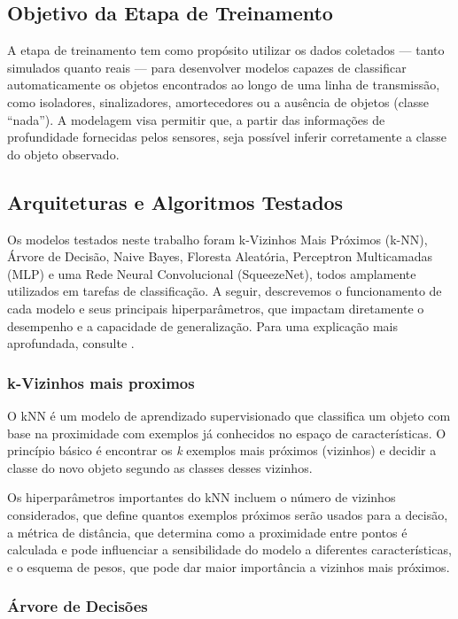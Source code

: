 \subsection{Objetivo da Etapa de Treinamento}

A etapa de treinamento tem como propósito utilizar os dados coletados — tanto simulados quanto reais — para desenvolver modelos capazes de classificar automaticamente os objetos encontrados ao longo de uma linha de transmissão, como isoladores, sinalizadores, amortecedores ou a ausência de objetos (classe “nada”). A modelagem visa permitir que, a partir das informações de profundidade fornecidas pelos sensores, seja possível inferir corretamente a classe do objeto observado.

\subsection{Arquiteturas e Algoritmos Testados}

Os modelos testados neste trabalho foram k-Vizinhos Mais Próximos (k-NN), Árvore de Decisão, Naive Bayes, Floresta Aleatória, Perceptron Multicamadas (MLP) e uma Rede Neural Convolucional (SqueezeNet), todos amplamente utilizados em tarefas de classificação. A seguir, descrevemos o funcionamento de cada modelo e seus principais hiperparâmetros, que impactam diretamente o desempenho e a capacidade de generalização. Para uma explicação mais aprofundada, consulte \cite{bishop2006pattern}.

\subsubsection{k-Vizinhos mais proximos}

O kNN é um modelo de aprendizado supervisionado que classifica um objeto com base na proximidade com exemplos já conhecidos no espaço de características. O princípio básico é encontrar os \textit{k} exemplos mais próximos (vizinhos) e decidir a classe do novo objeto segundo as classes desses vizinhos.

Os hiperparâmetros importantes do kNN incluem o número de vizinhos considerados, que define quantos exemplos próximos serão usados para a decisão, a métrica de distância, que determina como a proximidade entre pontos é calculada e pode influenciar a sensibilidade do modelo a diferentes características, e o esquema de pesos, que pode dar maior importância a vizinhos mais próximos.

\subsubsection{Árvore de Decisões}

